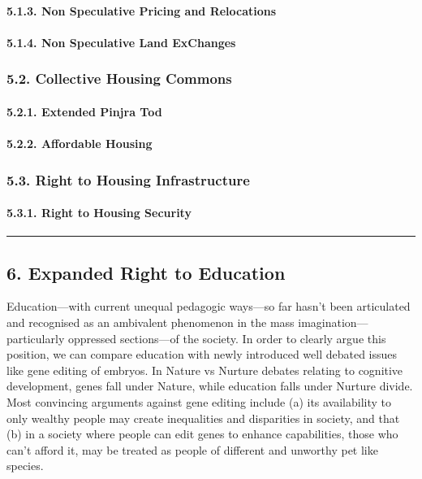 \paragraph{5.1.3. Non Speculative Pricing and
Relocations}\label{non-speculative-pricing-and-relocations}

\paragraph{5.1.4. Non Speculative Land
ExChanges}\label{non-speculative-land-exchanges}

\subsubsection{5.2. Collective Housing
Commons}\label{collective-housing-commons}

\paragraph{5.2.1. Extended Pinjra Tod}\label{extended-pinjra-tod}

\paragraph{5.2.2. Affordable Housing}\label{affordable-housing}

\subsubsection{5.3. Right to Housing
Infrastructure}\label{right-to-housing-infrastructure}

\paragraph{5.3.1. Right to Housing
Security}\label{right-to-housing-security}

\begin{center}\rule{0.5\linewidth}{0.5pt}\end{center}

\subsection{6. Expanded Right to
Education}\label{expanded-right-to-education}

Education---with current unequal pedagogic ways---so far hasn't been
articulated and recognised as an ambivalent phenomenon in the mass
imagination---particularly oppressed sections---of the society. In order
to clearly argue this position, we can compare education with newly
introduced well debated issues like gene editing of embryos. In Nature
vs Nurture debates relating to cognitive development, genes fall under
Nature, while education falls under Nurture divide. Most convincing
arguments against gene editing include (a) its availability to only
wealthy people may create inequalities and disparities in society, and
that (b) in a society where people can edit genes to enhance
capabilities, those who can't afford it, may be treated as people of
different and unworthy pet like species.

